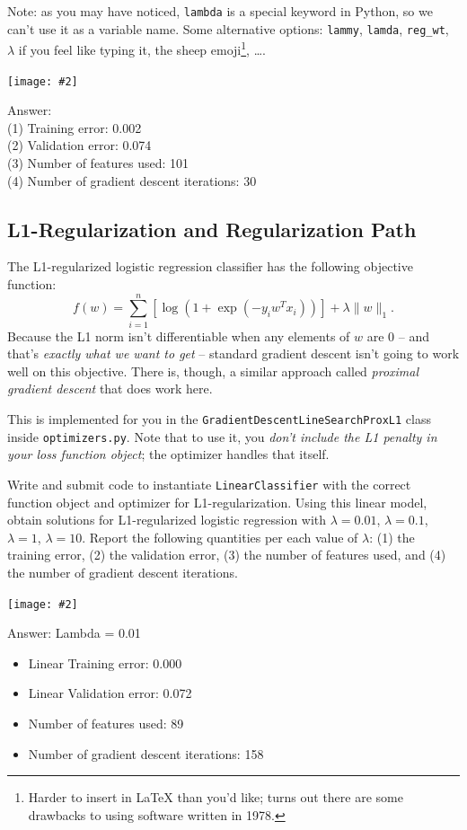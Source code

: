 \documentclass{article}
\def\ans#1{\par\gre{Answer: #1}}
\def\gre#1{{\color{gre}#1}}
\def\norm#1{\|#1\|}
\newcommand{\centerfig}[2]{\begin{center}\texttt{[image: \#2]}\end{center}}
\newenvironment{asking}{\begingroup\color{blu}}{\endgroup}
\begin{document}
Note: as you may have noticed, \verb|lambda| is a special keyword in Python, so we can't use it as a variable name.
Some alternative options:
\verb|lammy|,
\verb|lamda|,
\verb|reg_wt|,
$\lambda$ if you feel like typing it,
the sheep emoji\footnote{Harder to insert in \LaTeX{} than you'd like; turns out there are some drawbacks to using software written in 1978.},
\dots.
\centerfig{0.8}{q2.1-code}
\ans{\\
(1) Training error: 0.002\\
(2) Validation error: 0.074\\
(3) Number of features used: 101\\
(4) Number of gradient descent iterations: 30\\}
\pagebreak

\subsection{L1-Regularization and Regularization Path }
The L1-regularized logistic regression classifier has the following objective function:
\[
f(w) = \sum_{i=1}^n \left[\log(1+\exp(-y_iw^Tx_i))\right] + \lambda\norm{w}_1.
\]
Because the L1 norm isn't differentiable when any elements of $w$ are $0$ -- and that's \emph{exactly what we want to get} -- standard gradient descent isn't going to work well on this objective.
There is, though, a similar approach called \emph{proximal gradient descent} that does work here.%

This is implemented for you in the \verb|GradientDescentLineSearchProxL1| class inside \verb|optimizers.py|.
Note that to use it, you \emph{don't include the L1 penalty in your loss function object};
the optimizer handles that itself.

\begin{asking}Write and submit code to instantiate \verb|LinearClassifier| with the correct function object and optimizer for L1-regularization. Using this linear model, obtain solutions for L1-regularized logistic regression with $\lambda = 0.01$, $\lambda = 0.1$, $\lambda = 1$, $\lambda = 10$. Report the following quantities per each value of $\lambda$: (1) the training error, (2) the validation error, (3) the number of features used, and (4) the number of gradient descent iterations.\end{asking}
\centerfig{0.8}{q2.2-code}
\ans{
Lambda = 0.01
\begin{itemize}
    \item Linear Training error: 0.000
    \item Linear Validation error: 0.072
    \item Number of features used: 89
    \item Number of gradient descent iterations: 158
\end{itemize}
}
\end{document}
